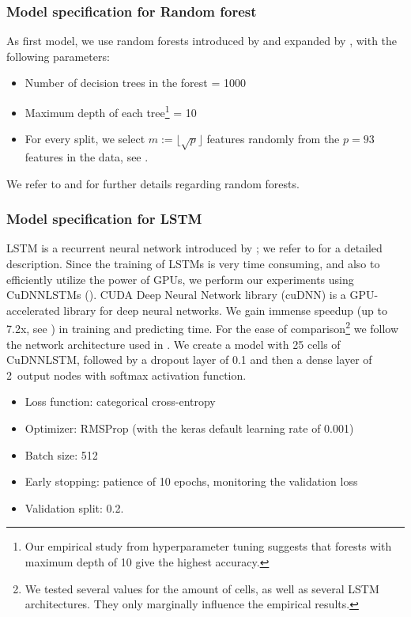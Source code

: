 \documentclass[review]{elsarticle}
\begin{document}
\subsubsection{Model specification for Random forest}
As first model, we use random forests introduced by \cite{ho1995random} and expanded by \cite{breiman2001random},
with the following parameters: \begin{itemize}
	\item Number of decision trees in the forest = 1000 
	
	\item Maximum depth of each tree\footnote{Our empirical study from hyperparameter tuning suggests that forests with maximum depth of 10 give the highest accuracy.} = 10


	\item For every split, we select $m:= {\lfloor \sqrt{p} \rfloor}$ features randomly from the $p=93$ features in the data, see \cite{pedregosa2011scikit}. 
	
\end{itemize}
We refer to \cite[Subsection~4.3.3]{krauss17} and \cite[Subsection~3.4]{krauss18} for further details regarding random forests.
\subsubsection{Model specification for LSTM} LSTM is a recurrent neural network introduced by \cite{schmidhuber1997long}; we refer to \cite{krauss18} for a detailed description. Since  the training of LSTMs is very time consuming, and also to efficiently utilize the power of GPUs, we perform our experiments using CuDNNLSTMs (\cite{chetlur2014cudnn}). CUDA Deep Neural Network library (cuDNN) is a GPU-accelerated library for deep neural networks. We gain immense speedup (up to 7.2x, see \cite{braun2018lstm}) in training and predicting time. 
For the ease of comparison\footnote{We tested several values  for the amount of cells,
	as well as several LSTM architectures.
They only marginally influence the empirical results.} we follow the network architecture used in \cite{krauss18}. We create a model with 25 cells 
of CuDNNLSTM, followed by a dropout layer of 0.1 and then a dense layer of 2~output nodes with softmax activation function. 

\begin{itemize}
    \item Loss function: categorical cross-entropy
    \item Optimizer: RMSProp (with the keras default learning rate of 0.001)
    \item Batch size: 512
    \item Early stopping: patience of 10 epochs, monitoring the validation loss
    \item Validation split: 0.2.
\end{itemize}
\end{document}
